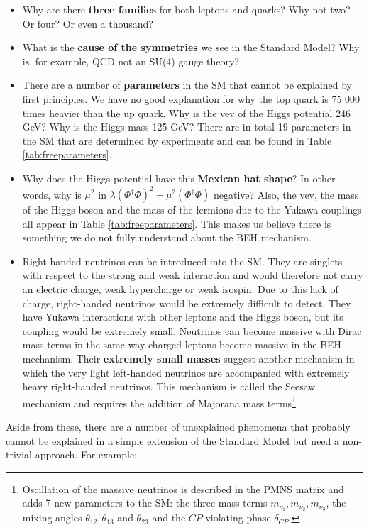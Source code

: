 \begin{itemize}
\item Why are there \textbf{three families} for both leptons and quarks? Why  not two? Or four? Or even a thousand?
\item What is the \textbf{cause of the symmetries} we see in the Standard Model? Why is, for example, QCD not an SU(4) gauge theory?
\item There are a number of \textbf{parameters} in the SM that cannot be explained by first principles. We have no good explanation for why the top quark is 75 000 times heavier than the up quark. Why is the vev of the Higgs potential 246 GeV? Why is the Higgs mass 125 GeV? There are in total 19 parameters in the SM that are determined by experiments and can be found in Table \ref{tab:freeparameters}.
\item Why does the Higgs potential have this\textbf{ Mexican hat shape}? In other words, why is $\mu^2$ in $\lambda \left(\Phi^\dagger \Phi \right)^2 + \mu^2\left(\Phi^\dagger \Phi \right)$ negative? Also, the vev, the mass of the Higgs boson and the mass of the fermions due to the Yukawa couplings all appear in Table \ref{tab:freeparameters}. This makes us believe there is something we do not fully understand about the BEH mechanism. 
\item Right-handed neutrinos can be introduced into the SM. They are singlets with respect to the strong and weak interaction and would therefore not carry an electric charge, weak hypercharge or weak isospin. Due to this lack of charge, right-handed neutrinos would be extremely difficult to detect. They have Yukawa interactions with other leptons and the Higgs boson, but its coupling would be extremely small. Neutrinos can become massive with Dirac mass terms in the same way charged leptons become massive in the BEH mechanism. Their \textbf{extremely small masses} suggest another mechanism in which the very light left-handed neutrinos are accompanied with extremely heavy right-handed neutrinos. This mechanism is called the Seesaw mechanism and requires the addition of Majorana mass terms\footnote{Oscillation of the massive neutrinos is described in the PMNS matrix and adds 7 new parameters to the SM: the three mass terms $m_{\nu_1},m_{\nu_2},m_{\nu_3}$, the mixing angles $\theta_{12},\theta_{13}$ and $\theta_{23}$ and the $CP$-violating phase $\delta_{CP}$. }.
\end{itemize}
\vspace{2mm}
\noindent Aside from these, there are a number of unexplained phenomena that probably cannot be explained in a simple extension of the Standard Model but need a non-trivial approach. For example:

